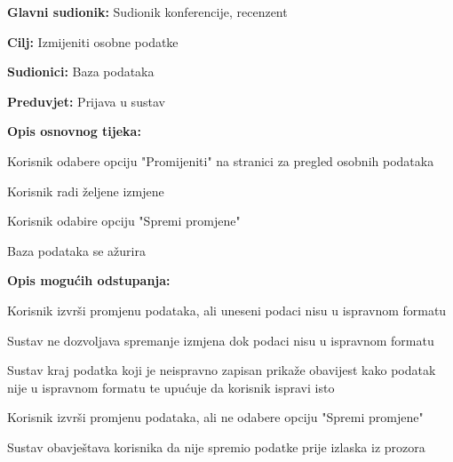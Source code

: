 					\noindent {}
					\begin{packed_item}
	
						\item \textbf{Glavni sudionik: } Sudionik konferencije, recenzent
						\item  \textbf{Cilj:} Izmijeniti osobne podatke
						\item  \textbf{Sudionici:} Baza podataka
						\item  \textbf{Preduvjet:} Prijava u sustav
						\item  \textbf{Opis osnovnog tijeka:}
						
						\item[] \begin{packed_enum}
	
							\item Korisnik odabere opciju "Promijeniti" na stranici za pregled osobnih podataka
							\item Korisnik radi željene izmjene
							\item Korisnik odabire opciju "Spremi promjene"
							\item Baza podataka se ažurira
					
						\end{packed_enum}

						\item  \textbf{Opis mogućih odstupanja:}
						
						\item[] \begin{packed_item}
	
							\item[2.a]  Korisnik izvrši promjenu podataka, ali uneseni podaci nisu u ispravnom formatu
							\item[] \begin{packed_enum}
								
								\item Sustav ne dozvoljava spremanje izmjena dok podaci nisu u ispravnom formatu
								\item Sustav kraj podatka koji je neispravno zapisan prikaže obavijest kako podatak nije u ispravnom formatu te upućuje da korisnik ispravi isto
								
							\end{packed_enum}

							\item[2.b]  Korisnik izvrši promjenu podataka, ali ne odabere opciju "Spremi promjene"
							\item[] \begin{packed_enum}
								
								\item Sustav obavještava korisnika da nije spremio podatke prije izlaska iz prozora
								
							\end{packed_enum}
							
						\end{packed_item}
			
					\end{packed_item}

